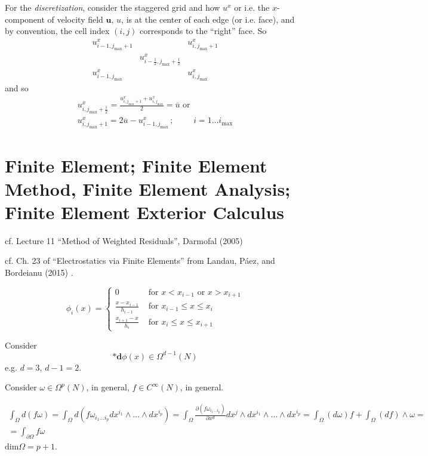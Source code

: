 \documentclass[10pt]{amsart}
\begin{document}
\begin{multicols*}{2}
For the \emph{discretization}, consider the staggered grid and how $u^x$ or i.e. the $x$-component of velocity field $\mathbf{u}$, $u$, is at the center of each edge (or i.e. face), and by convention, the cell index $(i,j)$ corresponds to the ``right'' face.  So
\[
\begin{matrix}
  u^x_{i-1,j_{\text{max}}+1} & & u^x_{i,j_{\text{max}} +1}   \\
  & u^x_{i-\frac{1}{2},j_{\text{max}}+\frac{1}{2}} & \\
  u^x_{i-1,j_{\text{max}}} & & u^x_{i,j_{\text{max}}} 
  \end{matrix}
\]
and so
\begin{equation}
  \begin{gathered}
    u^x_{i,j_{\text{max}}+\frac{1}{2}} = \frac{ u^x_{i,j_{\text{max}}+1} + u^x_{i,j_{\text{max}}} }{2} = \overline{u} \text{ or } \\
u^x_{i,j_{\text{max}}+1} = 2\overline{u} - u^x_{i-1,j_{\text{max}}} \, ; \, \qquad \, i = 1 \dots i_{\text{max}}
    \end{gathered}
  \end{equation}

\part{Finite Element; Finite Element Method, Finite Element Analysis; Finite Element Exterior Calculus}

cf. Lecture 11 ``Method of Weighted Residuals'',  Darmofal (2005) \cite{Darm2005}

cf. Ch. 23 of ``Electrostatics via Finite Elements'' from Landau, P\'{a}ez, and Bordeianu (2015) \cite{LPB2015}.


\begin{equation}
  \phi_i(x) = \begin{cases} 0 & \text{ for } x < x_{i-1} \text{ or } x > x_{i+1} \\
    \frac{x-x_{i-1} }{ h_{i-1}} & \text{ for } x_{i-1} \leq x \leq x_i \\
    \frac{x_{i+1} - x}{h_i } & \text{ for } x_i \leq x\leq x_{i+1} \end{cases}
  \end{equation}


Consider
\[
\mathbf{*} \mathbf{d}\phi(x) \in \Omega^{d-1}(N) 
\]
e.g. $d=3$, $d-1=2$.

Consider $\omega \in \Omega^p(N)$, in general, $f\in C^{\infty}(N)$, in general.

\[
\begin{gathered}
  \int_{\Omega} d(f\omega) = \int_{\Omega} d(f\omega_{i_1 \dots i_p }dx^{i_1} \wedge \dots \wedge dx^{i_p} ) = \int_{\Omega} \frac{ \partial (f\omega_{i_1 \dots i_p } ) }{ \partial x^d} dx^j \wedge dx^{i_1} \wedge \dots \wedge dx^{i_p} = \int_{\Omega} (d\omega ) f + \int_{\Omega} (df) \wedge \omega = \\
  = \int_{ \partial \Omega} f\omega
  \end{gathered}
\]
$\text{dim} \Omega = p+1$.


\end{multicols*}
\end{document}
